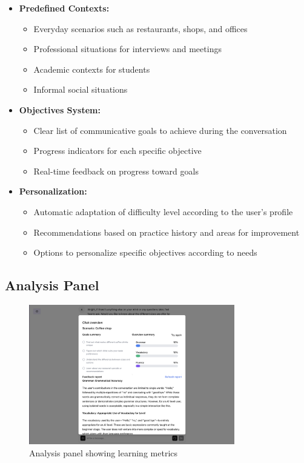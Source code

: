 \begin{itemize}
    \item \textbf{Predefined Contexts:}
    \begin{itemize}
        \item Everyday scenarios such as restaurants, shops, and offices
        \item Professional situations for interviews and meetings
        \item Academic contexts for students
        \item Informal social situations
    \end{itemize}
    
    \item \textbf{Objectives System:}
    \begin{itemize}
        \item Clear list of communicative goals to achieve during the conversation
        \item Progress indicators for each specific objective
        \item Real-time feedback on progress toward goals
    \end{itemize}
    
    \item \textbf{Personalization:}
    \begin{itemize}
        \item Automatic adaptation of difficulty level according to the user's profile
        \item Recommendations based on practice history and areas for improvement
        \item Options to personalize specific objectives according to needs
    \end{itemize}
\end{itemize}

\subsection{Analysis Panel}
\label{panel-analisis}

\begin{figure}[H]
    \centering
    \includegraphics[width=0.8\textwidth]{figuras/screenshots/report.png}
    \caption{Analysis panel showing learning metrics}
    \label{fig:analytics-panel}
\end{figure}

